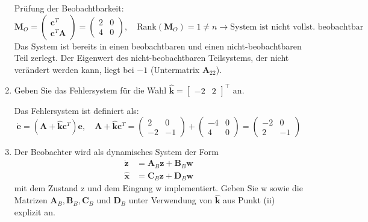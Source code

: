 \documentclass{article}
\begin{document}
\begin{task}
\begin{enumerate}[i]
\begin{solution}
Prüfung der Beobachtbarkeit:
\[\mathbf{M}_O = 
     \begin{pmatrix} \mathbf{c}^T \\ \mathbf{c}^T \mathbf{A} \end{pmatrix} = 
     \begin{pmatrix} 2 & 0 \\ 4 & 0  \end{pmatrix}, \quad
     \text{Rank}\left(\mathbf{M}_O\right) = 1 \neq n \rightarrow \text{System ist nicht vollst. beobachtbar}
\]
Das System ist bereits in einen beobachtbaren und einen nicht-beobachtbaren Teil zerlegt. 
Der Eigenwert des nicht-beobachtbaren Teilsystems, der nicht verändert werden kann, liegt bei $-1$ (Untermatrix $\mathbf{A}_{22}$).
\end{solution}
\item Geben Sie das Fehlersystem für die Wahl $\hat{\mathbf{k}}=\left[\begin{array}{cc}{-2} & {2}\end{array}\right]^{\top}$ an.
\begin{solution}
Das Fehlersystem ist definiert als:
\[ 
\dot{\mathbf{e}}=\left(\mathbf{A}+\hat{\mathbf{k}} \mathbf{c}^{T}\right) \mathbf{e},
\quad \mathbf{A}+\hat{\mathbf{k}} \mathbf{c}^{T} = 
\begin{pmatrix}
2 & 0 \\
-2 & -1
\end{pmatrix} +
\begin{pmatrix}
-4 & 0 \\
4 & 0
\end{pmatrix}
=
\begin{pmatrix}
-2 & 0 \\
2 & -1
\end{pmatrix}
 \]
\end{solution}
\item Der Beobachter wird als dynamisches System der Form
\[\begin{aligned} \dot{\mathbf{z}} &=\mathbf{A}_{B} \mathbf{z}+\mathbf{B}_{B} \mathbf{w} \\ \hat{\mathbf{x}} &=\mathbf{C}_{B} \mathbf{z}+\mathbf{D}_{B} \mathbf{w} \end{aligned}\]
mit dem Zustand z und dem Eingang w implementiert. Geben Sie w sowie die
Matrizen $\mathbf{A}_{B}, \mathbf{B}_{B}, \mathbf{C}_{B}$ und $\mathbf{D}_{B}$ unter Verwendung von $\hat{\mathbf{k}}$ aus Punkt (ii) explizit
an.


\end{enumerate}
\end{task}
\end{document}
